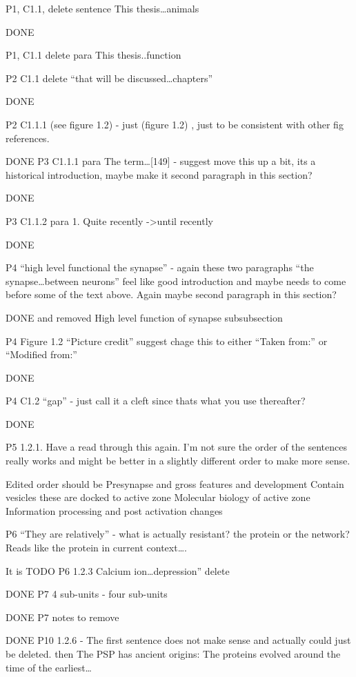 P1, C1.1, delete sentence This thesis…animals

DONE

P1, C1.1 delete para This thesis..function


P2 C1.1 delete “that will be discussed…chapters”


DONE

P2 C1.1.1 (see figure 1.2) - just (figure 1.2) , just to be consistent with other fig references.


DONE
P3 C1.1.1 para The term…[149] - suggest move this up a bit, its a historical introduction, maybe make it second paragraph in this section?

DONE

P3 C1.1.2 para 1. Quite recently ->until recently

DONE

P4 “high level functional the synapse” - again these two paragraphs “the synapse…between neurons” feel like good introduction and maybe needs to come before some of the text above. Again maybe second paragraph in this section?

DONE and removed High level function of synapse subsubsection

P4 Figure 1.2 “Picture credit” suggest chage this to either “Taken from:” or “Modified from:”

DONE

P4 C1.2 “gap” - just call it a cleft since thats what you use thereafter?

DONE

P5 1.2.1. Have a read through this again. I’m not sure the order of the sentences really works and might be better in a slightly different order to make more sense.


Edited order should be
Presynapse and gross features and development
Contain vesicles these are docked to active zone
Molecular biology of active zone
Information processing and post activation changes

P6 “They are relatively” - what is actually resistant? the protein or the network? Reads like the protein in current context….

It is TODO 
P6 1.2.3 Calcium ion…depression” delete

DONE
P7 4 sub-units - four sub-units

DONE
P7 notes to remove

DONE
P10 1.2.6 - The first sentence does not make sense and actually could just be deleted. then The PSP has ancient origins: The proteins evolved around the time of the earliest…

